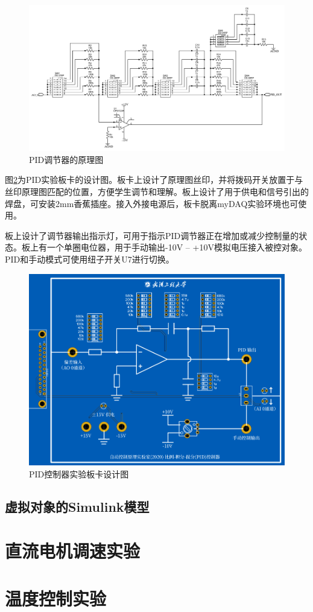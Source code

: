 \documentclass[11pt,a4paper]{article}
\begin{document}
\begin{figure}[H]\centering
  \includegraphics[width=15cm]{./figs/pid_sch.pdf}
  \caption{PID调节器的原理图}\label{pid_sch}
\end{figure}

图\ref{pid_board}为PID实验板卡的设计图。板卡上设计了原理图丝印，并将拨码开关放置于与丝印原理图匹配的位置，方便学生调节和理解。板上设计了用于供电和信号引出的焊盘，可安装2mm香蕉插座。接入外接电源后，板卡脱离myDAQ实验环境也可使用。

板上设计了调节器输出指示灯，可用于指示PID调节器正在增加或减少控制量的状态。板上有一个单圈电位器，用于手动输出-10V -- +10V模拟电压接入被控对象。PID和手动模式可使用纽子开关U7进行切换。

\begin{figure}[H]\centering
  \includegraphics[width=12cm]{./figs/pid_board.png}
  \caption{PID控制器实验板卡设计图}\label{pid_board}
\end{figure}

\subsection{虚拟对象的Simulink模型}



\section{直流电机调速实验}



\section{温度控制实验}
\end{document}
